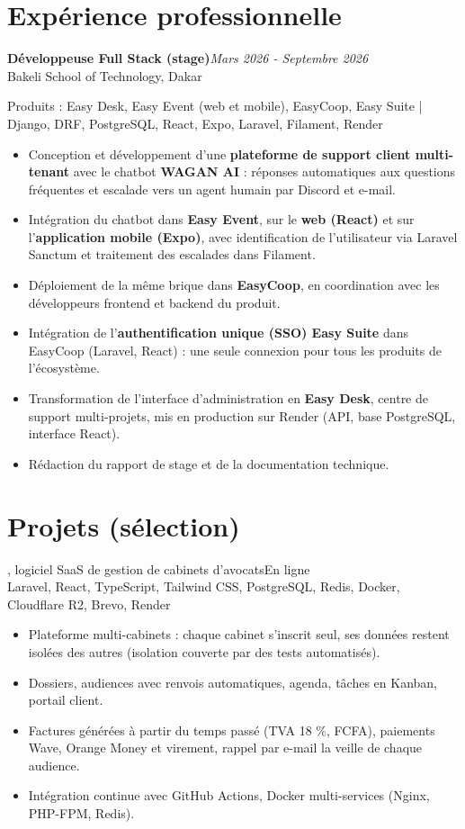 \documentclass[10pt,a4paper]{article}
\newcommand{\poste}[3]{%
  {\bfseries #1}\hfill{\color{gris}\itshape #3}\\
  {\color{bleu}#2}\par\vspace{2pt}}
\newcommand{\projet}[4]{%
  \vspace{5pt}{\bfseries #1}, #2\hfill{\color{gris}\small #4}\\
  {\color{gris}\small #3}\par}
\begin{document}
\section{Expérience professionnelle}
\poste{Développeuse Full Stack (stage)}{Bakeli School of Technology, Dakar}{Mars 2026 - Septembre 2026}
{\small\color{gris} Produits : Easy Desk, Easy Event (web et mobile), EasyCoop, Easy Suite \;|\;
Django, DRF, PostgreSQL, React, Expo, Laravel, Filament, Render}
\begin{itemize}
  \item Conception et développement d'une \textbf{plateforme de support client multi-tenant} avec le chatbot
        \textbf{WAGAN AI} : réponses automatiques aux questions fréquentes et escalade vers un agent humain
        par Discord et e-mail.
  \item Intégration du chatbot dans \textbf{Easy Event}, sur le \textbf{web (React)} et sur
        l'\textbf{application mobile (Expo)}, avec identification de l'utilisateur via Laravel Sanctum et
        traitement des escalades dans Filament.
  \item Déploiement de la même brique dans \textbf{EasyCoop}, en coordination avec les développeurs
        frontend et backend du produit.
  \item Intégration de l'\textbf{authentification unique (SSO) Easy Suite} dans EasyCoop (Laravel, React) :
        une seule connexion pour tous les produits de l'écosystème.
  \item Transformation de l'interface d'administration en \textbf{Easy Desk}, centre de support
        multi-projets, mis en production sur Render (API, base PostgreSQL, interface React).
  \item Rédaction du rapport de stage et de la documentation technique.
\end{itemize}

\section{Projets (sélection)}

\projet{Lexora}{logiciel SaaS de gestion de cabinets d'avocats}
{Laravel, React, TypeScript, Tailwind CSS, PostgreSQL, Redis, Docker, Cloudflare R2, Brevo, Render}{En ligne}
\begin{itemize}
  \item Plateforme multi-cabinets : chaque cabinet s'inscrit seul, ses données restent isolées des autres
        (isolation couverte par des tests automatisés).
  \item Dossiers, audiences avec renvois automatiques, agenda, tâches en Kanban, portail client.
  \item Factures générées à partir du temps passé (TVA 18 \%, FCFA), paiements Wave, Orange Money et
        virement, rappel par e-mail la veille de chaque audience.
  \item Intégration continue avec GitHub Actions, Docker multi-services (Nginx, PHP-FPM, Redis).
\end{itemize}
\end{document}
